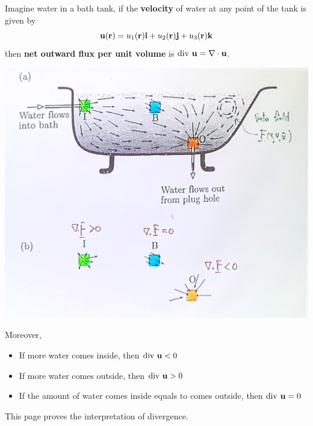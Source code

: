 \begin{spacing}{1.3}
    Imagine water in a bath tank, if the {\bf velocity} of water at any point 
    of the tank is given by $$\uu (\rr)=u_1(\rr) \ii +u_2(\rr) \jj + u_3(\rr)\kk$$
    then {\bf net outward flux per unit volume} is $\div \uu =\nabla \cdot \uu$.
    \begin{center}
        \includegraphics[scale=0.18]{images/Ch15-bath.JPG}
    \end{center}
    Moreover, 
    \begin{itemize}
        \item If more water comes inside, then $\div \uu <0$
        \item If more water comes outside, then $\div \uu >0$
        \item If the amount of water comes inside equals to comes outside, then $\div \uu =0$
    \end{itemize}

    \newpage
    {\blue This page proves the interpretation of divergence.}
    \begin{center}
    \begin{tikzpicture}[x=0.75pt,y=0.75pt,yscale=-1,xscale=1,scale=1.3]


\end{tikzpicture}
\end{center}
\end{spacing}
